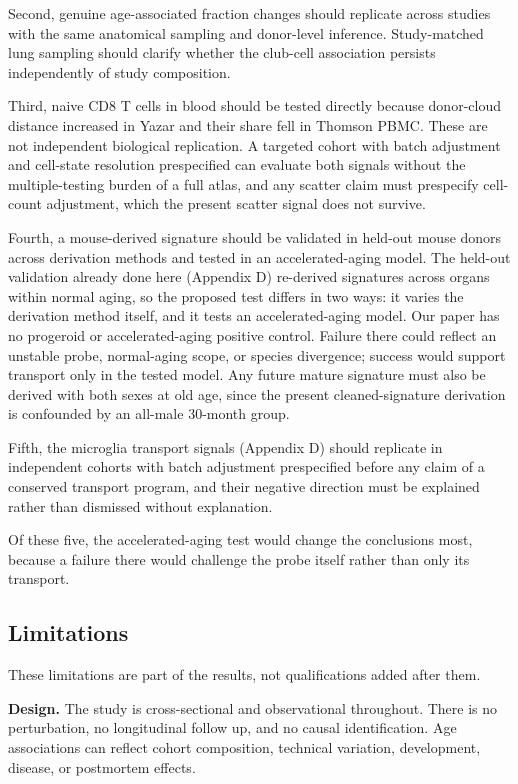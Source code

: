 \documentclass[11pt]{article}
\begin{document}
Second, genuine age-associated fraction changes should replicate across studies with the same anatomical sampling and donor-level inference. Study-matched lung sampling should clarify whether the club-cell association persists independently of study composition.

Third, naive CD8 T cells in blood should be tested directly because donor-cloud distance increased in Yazar and their share fell in Thomson PBMC. These are not independent biological replication. A targeted cohort with batch adjustment and cell-state resolution prespecified can evaluate both signals without the multiple-testing burden of a full atlas, and any scatter claim must prespecify cell-count adjustment, which the present scatter signal does not survive.

Fourth, a mouse-derived signature should be validated in held-out mouse donors across derivation methods and tested in an accelerated-aging model. The held-out validation already done here (Appendix D) re-derived signatures across organs within normal aging, so the proposed test differs in two ways: it varies the derivation method itself, and it tests an accelerated-aging model. Our paper has no progeroid or accelerated-aging positive control. Failure there could reflect an unstable probe, normal-aging scope, or species divergence; success would support transport only in the tested model. Any future mature signature must also be derived with both sexes at old age, since the present cleaned-signature derivation is confounded by an all-male 30-month group.

Fifth, the microglia transport signals (Appendix D) should replicate in independent cohorts with batch adjustment prespecified before any claim of a conserved transport program, and their negative direction must be explained rather than dismissed without explanation.

Of these five, the accelerated-aging test would change the conclusions most, because a failure there would challenge the probe itself rather than only its transport.

\subsection*{Limitations}

These limitations are part of the results, not qualifications added after them.

\textbf{Design.} The study is cross-sectional and observational throughout. There is no perturbation, no longitudinal follow up, and no causal identification. Age associations can reflect cohort composition, technical variation, development, disease, or postmortem effects.
\end{document}
